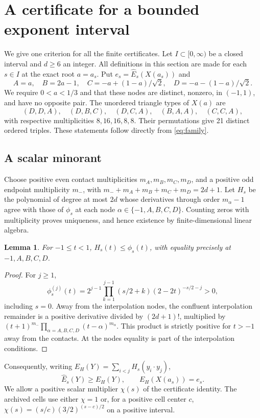 \documentclass[12pt,reqno]{amsart}
\newtheorem{lemma}[theorem]{Lemma}
\theoremstyle{definition}
\newcommand{\Eh}{\widehat E}
\numberwithin{equation}{section}
\begin{document}
\section{A certificate for a bounded exponent interval}\label{sec:finite}
We give one criterion for all the finite certificates. Let $I\subset[0,\infty)$
be a closed interval and $d\ge6$ an integer. All definitions in this
section are made for each $s\in I$ at the exact root $a=a_s$.
Put $e_s=\Eh_s(X(a_s))$ and
\begin{equation}\label{eq:nodes}
 A=a,\quad B=2a-1,\quad
 C=-a+(1-a)/\sqrt2,\quad D=-a-(1-a)/\sqrt2.
\end{equation}
We require $0<a<1/3$ and that these nodes are distinct, nonzero, in
$(-1,1)$, and have no opposite pair. The unordered triangle types of
$X(a)$ are
\[
 (D,D,A),\quad(D,B,C),\quad(D,C,A),\quad(B,A,A),\quad(C,C,A),
\]
with respective multiplicities $8,16,16,8,8$. Their permutations give 21 distinct
ordered triples. These statements follow directly from \eqref{eq:family}.

\subsection{A scalar minorant}
Choose positive even contact multiplicities $m_A,m_B,m_C,m_D$, and a
positive odd endpoint multiplicity $m_-$, with
$m_-+m_A+m_B+m_C+m_D=2d+1$.
Let $H_s$ be the polynomial of degree at most $2d$ whose derivatives
through order $m_\alpha-1$ agree with those of $\phi_s$ at each node
$\alpha\in\{-1,A,B,C,D\}$. Counting zeros with multiplicity proves
uniqueness, and hence existence by finite-dimensional linear algebra.

\begin{lemma}\label{lem:minorant}
For $-1\le t<1$, $H_s(t)\le\phi_s(t)$, with equality precisely at
$-1,A,B,C,D$.
\end{lemma}
\begin{proof}
For $j\ge1$,
\[
 \phi_s^{(j)}(t)=2^{j-1}\prod_{k=1}^{j-1}(s/2+k)
                    (2-2t)^{-s/2-j}>0,
\]
including $s=0$. Away from the interpolation nodes, the confluent
interpolation remainder is a positive derivative divided by $(2d+1)!$,
multiplied by
$(t+1)^{m_-}\prod_{\alpha=A,B,C,D}(t-\alpha)^{m_\alpha}$.
This product is strictly positive for $t>-1$ away from the contacts.
At the nodes equality is part of the interpolation conditions.
\end{proof}
Consequently, writing $E_H(Y)=\sum_{i<j}H_s(y_i\cdot y_j)$,
\begin{equation}\label{finite73:scalarenergy}
 \Eh_s(Y)\ge E_H(Y),\qquad E_H(X(a_s))=e_s.
\end{equation}
We allow a positive scalar multiplier $\chi(s)$ of the certificate
identity. The archived cells use either $\chi=1$ or, for a positive
cell center $c$, $\chi(s)=(s/c)(3/2)^{(s-c)/2}$ on a positive interval.
\end{document}
